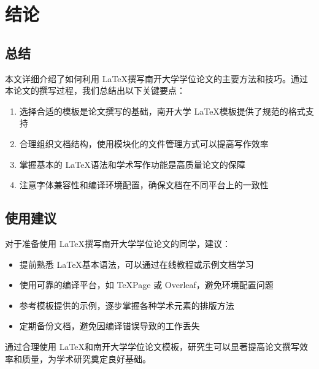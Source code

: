
\chapter{结论}

\section{总结}

本文详细介绍了如何利用 \LaTeX 撰写南开大学学位论文的主要方法和技巧。通过本论文的撰写过程，我们总结出以下关键要点：

\begin{enumerate}
    \item 选择合适的模板是论文撰写的基础，南开大学 \LaTeX 模板提供了规范的格式支持
    \item 合理组织文档结构，使用模块化的文件管理方式可以提高写作效率
    \item 掌握基本的 \LaTeX 语法和学术写作功能是高质量论文的保障
    \item 注意字体兼容性和编译环境配置，确保文档在不同平台上的一致性
\end{enumerate}

\section{使用建议}

对于准备使用 \LaTeX 撰写南开大学学位论文的同学，建议：

\begin{itemize}
    \item 提前熟悉 \LaTeX 基本语法，可以通过在线教程或示例文档学习
    \item 使用可靠的编译平台，如 TeXPage 或 Overleaf，避免环境配置问题
    \item 参考模板提供的示例，逐步掌握各种学术元素的排版方法
    \item 定期备份文档，避免因编译错误导致的工作丢失
\end{itemize}

通过合理使用 \LaTeX 和南开大学学位论文模板，研究生可以显著提高论文撰写效率和质量，为学术研究奠定良好基础。

